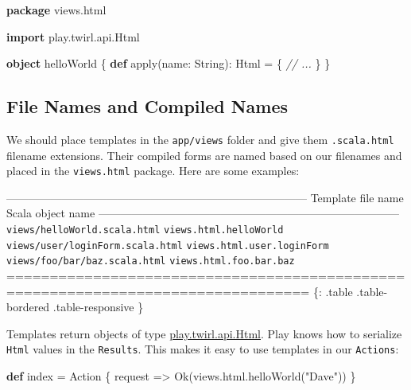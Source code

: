 \documentclass[oneside,11pt,a4paper,]{book}
\newenvironment{Shaded}{\begin{snugshade}}{\end{snugshade}}
\newcommand{\KeywordTok}[1]{\textcolor[rgb]{0.13,0.29,0.53}{\textbf{{#1}}}}
\newcommand{\StringTok}[1]{\textcolor[rgb]{0.31,0.60,0.02}{{#1}}}
\newcommand{\CommentTok}[1]{\textcolor[rgb]{0.56,0.35,0.01}{\textit{{#1}}}}
\newcommand{\FunctionTok}[1]{\textcolor[rgb]{0.00,0.00,0.00}{{#1}}}
\newcommand{\NormalTok}[1]{{#1}}
\begin{document}
\begin{Shaded}
\begin{Highlighting}[]
\KeywordTok{package} \NormalTok{views.}\FunctionTok{html}

\KeywordTok{import} \NormalTok{play.}\FunctionTok{twirl}\NormalTok{.}\FunctionTok{api}\NormalTok{.}\FunctionTok{Html}

\KeywordTok{object} \NormalTok{helloWorld \{}
  \KeywordTok{def} \FunctionTok{apply}\NormalTok{(name: String): Html = \{}
    \CommentTok{// ...}
  \NormalTok{\}}
\NormalTok{\}}
\end{Highlighting}
\end{Shaded}

\subsection{File Names and Compiled
Names}\label{file-names-and-compiled-names}

We should place templates in the \texttt{app/views} folder and give them
\texttt{.scala.html} filename extensions. Their compiled forms are named
based on our filenames and placed in the \texttt{views.html} package.
Here are some examples:

\textbar{}---------------------------------------------------------------------------------\textbar{}
\textbar{} Template file name \textbar{} Scala object name \textbar{}
\textbar{}---------------------------------------------------------------------------------\textbar{}
\textbar{} \texttt{views/helloWorld.scala.html} \textbar{}
\texttt{views.html.helloWorld} \textbar{} \textbar{}
\texttt{views/user/loginForm.scala.html} \textbar{}
\texttt{views.html.user.loginForm} \textbar{} \textbar{}
\texttt{views/foo/bar/baz.scala.html} \textbar{}
\texttt{views.html.foo.bar.baz} \textbar{}
\textbar{}=================================================================================\textbar{}
\{: .table .table-bordered .table-responsive \}

Templates return objects of type
\href{https://github.com/playframework/twirl/blob/master/api/src/main/scala/play/twirl/api/Formats.scala}{play.twirl.api.Html}.
Play knows how to serialize \texttt{Html} values in the
\texttt{Results}. This makes it easy to use templates in our
\texttt{Actions}:

\begin{Shaded}
\begin{Highlighting}[]
\KeywordTok{def} \NormalTok{index = Action \{ request =>}
  \FunctionTok{Ok}\NormalTok{(views.}\FunctionTok{html}\NormalTok{.}\FunctionTok{helloWorld}\NormalTok{(}\StringTok{"Dave"}\NormalTok{))}
\NormalTok{\}}
\end{Highlighting}
\end{Shaded}
\end{document}
